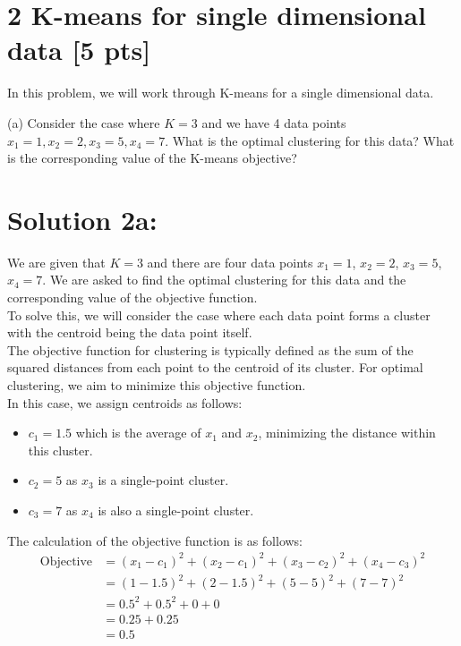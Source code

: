 \documentclass[10pt]{article}
\begin{document}
\section*{2 K-means for single dimensional data [5 pts]}
In this problem, we will work through K-means for a single dimensional data.

(a) Consider the case where $K=3$ and we have 4 data points $x_{1}=1, x_{2}=2, x_{3}=5, x_{4}=7$. What is the optimal clustering for this data? What is the corresponding value of the K-means objective?

\section*{Solution 2a:}

We are given that \( K = 3 \) and there are four data points \( x_1 = 1 \), \( x_2 = 2 \), \( x_3 = 5 \), \( x_4 = 7 \). We are asked to find the optimal clustering for this data and the corresponding value of the objective function. \\

To solve this, we will consider the case where each data point forms a cluster with the centroid being the data point itself. \\

The objective function for clustering is typically defined as the sum of the squared distances from each point to the centroid of its cluster. For optimal clustering, we aim to minimize this objective function. \\

In this case, we assign centroids as follows:
\begin{itemize}
\item \( c_1 = 1.5 \) which is the average of \( x_1 \) and \( x_2 \), minimizing the distance within this cluster.
\item \( c_2 = 5 \) as \( x_3 \) is a single-point cluster.
\item \( c_3 = 7 \) as \( x_4 \) is also a single-point cluster.
\end{itemize}

The calculation of the objective function is as follows:
\begin{align*}
\text{Objective} &= (x_1 - c_1)^2 + (x_2 - c_1)^2 + (x_3 - c_2)^2 + (x_4 - c_3)^2 \\
&= (1 - 1.5)^2 + (2 - 1.5)^2 + (5 - 5)^2 + (7 - 7)^2 \\
&= 0.5^2 + 0.5^2 + 0 + 0 \\
&= 0.25 + 0.25 \\
&= 0.5
\end{align*}
\end{document}
